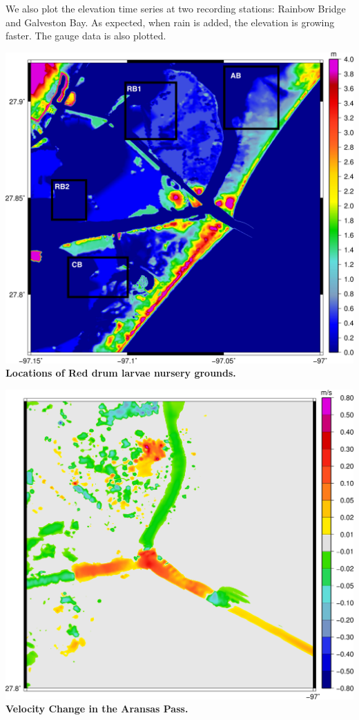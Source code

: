 \documentclass[american]{article}
\begin{document}
\begin{multicols}{3}
We also plot the elevation time series at two recording stations: Rainbow Bridge and Galveston Bay. As expected, when rain is added, the elevation is growing faster. The gauge data is also plotted.
\begin{center}
\begin{minipage}[h]{0.475\linewidth}\includegraphics[width=1.0\textwidth]{media/images/Particle_tracking_highlight.jpg}\textbf{  Locations of Red drum larvae nursery grounds.}
\end{minipage}
\quad\begin{minipage}[h]{0.475\linewidth}\includegraphics[width=1.0\textwidth]{media/images/velocity_comp_120001.jpg}\textbf{  Velocity Change in the Aransas Pass.}
\end{minipage}
\end{center}
%

\end{multicols}
\end{document}
